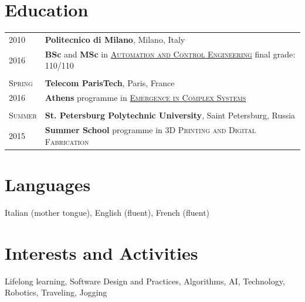 \documentclass[a4paper,10pt]{article}
\begin{document}
   \section{Education}
      \begin{tabular}{p{1.7cm}|p{15.5cm}}
         \centering\textsc{2010} & \textbf{Politecnico di Milano}, Milano, Italy\\
         \centering\textsc{2016} & \textbf{BSc} and \textbf{MSc} in \textsc{\href{http://www.polinternational.polimi.it/educational-offer/laurea-magistrale-equivalent-to-master-of-science-programmes/automation-and-control-engineering/}{Automation and Control Engineering}} \hfill final grade: \textsc{110/110} \\ 
         
         \multicolumn{2}{c}{} \\
         \centering\textsc{Spring} & \textbf{Telecom ParisTech}, Paris, France\\
         \centering\textsc{2016}   &  \textbf{Athens} programme in \textsc{\href{http://www.athensprogramme.com/catalog/show/1640}{Emergence in Complex Systems}}\\
         
         \multicolumn{2}{c}{} \\
         \centering\textsc{Summer} & \textbf{St. Petersburg Polytechnic University}, Saint Petersburg, Russia\\
         \centering\textsc{2015}      & \textbf{Summer School} programme in \textsc{3D Printing and Digital Fabrication}\\
      \end{tabular}

   \section{Languages}
   Italian (mother tongue), English (fluent), French (fluent)

   \section{Interests and Activities}
   Lifelong learning, Software Design and Practices, Algorithms, AI, Technology, Robotics, Traveling, Jogging\\
\end{document}
